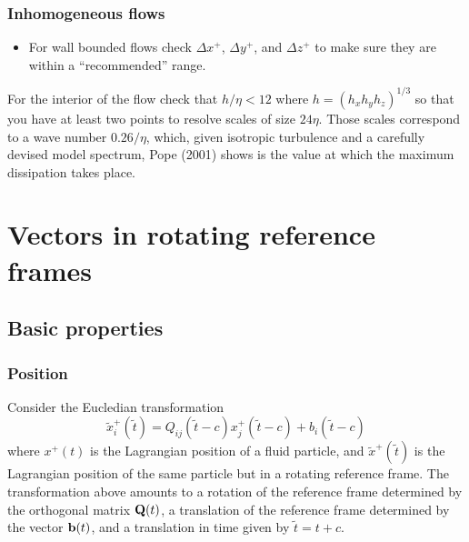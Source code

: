 \documentclass[oneside,a4paper,11pt]{report}
\begin{document}
\subsection{Inhomogeneous flows}
\begin{itemize}
\item For wall bounded flows check $\Delta x^+$, $\Delta y^+$, and $\Delta z^+$ to make sure they are within a ``recommended'' range.
\end{itemize}

For the interior of the flow check that $h/\eta < 12$ where $h = (h_x h_y h_z)^{1/3}$ so that you have at least two points to resolve scales of size $24 \eta$. Those scales correspond to a wave number $0.26/\eta$, which, given isotropic turbulence and a carefully devised model spectrum, Pope (2001) shows is the value at which the maximum dissipation takes place.


\appendix																		             %

%
\chapter{Vectors in rotating reference frames}
%

\section{Basic properties}
\subsection{Position}
Consider the Eucledian transformation
\begin{equation}
\label{eq:x_rot}
\tilde{x}^+_i(\tilde{t}) = Q_{ij}(\tilde{t}-c) x^+_j(\tilde{t}-c) + b_i(\tilde{t}-c) 
\end{equation}
where $x^+(t)$ is the Lagrangian position of a fluid particle, and $\tilde{x}^+(\tilde{t})$ is the Lagrangian position of the same particle but in a rotating reference frame. The transformation above amounts to a rotation of the reference frame determined by the orthogonal matrix $\bold{Q}(t)$, a translation of the reference frame determined by the vector $\bold{b}(t)$, and a translation in time given by $\tilde{t} = t + c$. 
\end{document}
